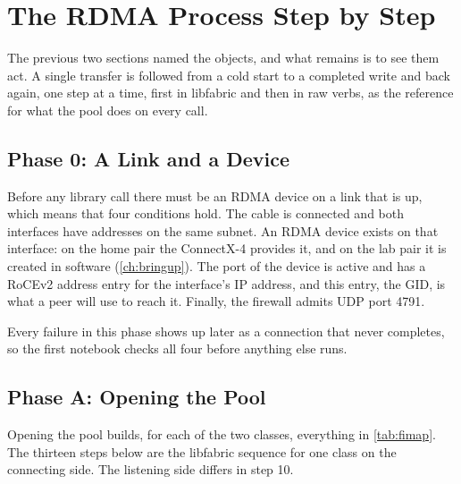 \section{The RDMA Process Step by Step}
\label{ch:process}

The previous two sections named the objects, and what remains is to see
them act. A single transfer is followed from a cold start to a completed
write and back again, one step at a time, first in libfabric and then in raw verbs, as the reference for
what the pool does on every call.

\subsection{Phase 0: A Link and a Device}

Before any library call there must be an RDMA device on a link that is up,
which means that four conditions hold. The cable is connected and both
interfaces have addresses on the same subnet. An RDMA device exists on that
interface: on the home pair the ConnectX-4 provides it, and on the lab pair
it is created in software (\cref{ch:bringup}). The port of the device is
active and has a RoCEv2 address entry for the interface's IP address, and
this entry, the GID, is what a peer will use to reach it. Finally, the
firewall admits UDP port 4791.

Every failure in this phase shows up later as a connection that never
completes, so the first notebook checks all four before anything else runs.

\subsection{Phase A: Opening the Pool}

Opening the pool builds, for each of the two classes, everything in
\cref{tab:fimap}. The thirteen steps below are the libfabric sequence for one
class on the connecting side. The listening side differs in step 10.

